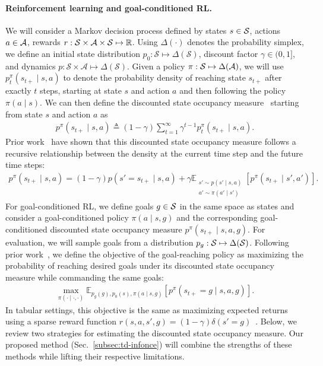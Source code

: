 \documentclass{article} %
\begin{document}
\paragraph{Reinforcement learning and goal-conditioned RL.} We will consider a Markov decision process defined by states $s \in {\mathcal{S}}$, actions $a \in {\mathcal{A}}$, rewards $r: {\mathcal{S}} \times {\mathcal{A}} \times {\mathcal{S}} \mapsto \mathbb{R}$. %
Using  $\Delta(\cdot)$ denotes the probability simplex, we define an initial state distribution $p_0: \mathcal{S} \mapsto \Delta(\mathcal{S})$,  discount factor $\gamma \in (0, 1]$, and  dynamics $p: \mathcal{S} \times \mathcal{A} \mapsto \Delta(\mathcal{S})$.
Given a policy $\pi: {\mathcal{S}} \mapsto \Delta({\mathcal{A}})$, we will use $p^{\pi}_t(s_{t+} \mid s, a)$ to denote the probability density of reaching state $s_{t+}$ after exactly $t$ steps, starting at state $s$ and action $a$ and then following the policy $\pi(a \mid s)$. We can then define the discounted state occupancy measure~\citep{ho2016generative, zhang2020gradientdice, eysenbach2020c, eysenbach2022contrastive, zheng2023stabilizing} starting from state $s$ and action $a$ as 
\begin{align}
    p^{\pi}(s_{t+} \mid s, a) \triangleq (1 - \gamma) \sum_{t = 1}^{\infty} \gamma^{t - 1} p_t^{\pi}(s_{t+} \mid s, a).
    \label{eq:discounted-state-occupancy-measure}
\end{align}
Prior work~\citep{dayan1993improving} have shown that this discounted state occupancy measure follows a recursive relationship between the density at the current time step and the future time steps:
\begin{align}
    p^{\pi}(s_{t+} \mid s, a) = (1 - \gamma) p(s' = s_{t+} \mid s, a) + \gamma \mathbb{E}_{\substack{s' \sim p(s' \mid s, a) \\ a' \sim \pi(a' \mid s')}} \left[ p^{\pi}(s_{t+} \mid s', a') \right].
    \label{eq:discounted-state-occupancy-measure-recurrence}
\end{align}
For goal-conditioned RL, we define goals $g \in {\mathcal{S}}$ in the same space as states and consider a  goal-conditioned policy $\pi(a \mid s, g)$ and the corresponding goal-conditioned discounted state occupancy measure $p^{\pi}(s_{t+} \mid s, a, g)$. For evaluation, we will sample goals from a distribution $p_g: {\mathcal{S}} \mapsto \Delta({\mathcal{S}})$. Following prior work~\citep{eysenbach2020c, rudner2021outcome}, we define the objective of the goal-reaching policy as maximizing the probability of reaching desired goals under its discounted state occupancy measure while commanding the same goals:
\begin{align}
    \max_{\pi(\cdot \mid \cdot, \cdot)} \mathbb{E}_{p_g(g),  p_0(s), \pi(a \mid s, g)} \left[ p^{\pi}(s_{t+} = g \mid s, a, g) \right].
    \label{eq:policy-obj}
\end{align}
In tabular settings, this objective is the same as maximizing expected returns using a sparse reward function $r(s, a, s', g) = (1 - \gamma) \delta(s' = g)$~\citep{eysenbach2022contrastive}.
Below, we review two strategies for estimating the discounted state occupancy measure. Our proposed method (Sec.~\ref{subsec:td-infonce}) will combine the strengths of these methods while lifting their respective limitations.
\end{document}
